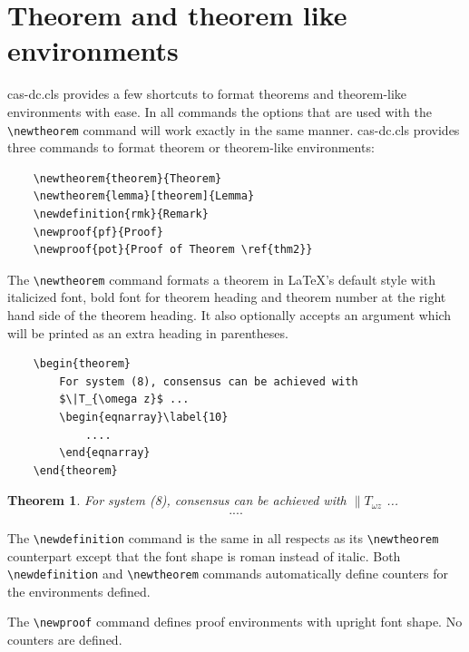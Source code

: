 \documentclass[a4paper,fleqn]{cas-dc}
\begin{document}
\section[Theorem and ...]{Theorem and theorem like environments}

{cas-dc.cls} provides a few shortcuts to format theorems and
theorem-like environments with ease. In all commands the options that
are used with the \verb+\newtheorem+ command will work exactly in the same
manner. {cas-dc.cls} provides three commands to format theorem or
theorem-like environments: 

\begin{verbatim}
	\newtheorem{theorem}{Theorem}
	\newtheorem{lemma}[theorem]{Lemma}
	\newdefinition{rmk}{Remark}
	\newproof{pf}{Proof}
	\newproof{pot}{Proof of Theorem \ref{thm2}}
\end{verbatim}


The \verb+\newtheorem+ command formats a
theorem in \LaTeX's default style with italicized font, bold font
for theorem heading and theorem number at the right hand side of the
theorem heading.  It also optionally accepts an argument which
will be printed as an extra heading in parentheses. 

\begin{verbatim}
	\begin{theorem} 
		For system (8), consensus can be achieved with 
		$\|T_{\omega z}$ ...
		\begin{eqnarray}\label{10}
			....
		\end{eqnarray}
	\end{theorem}
\end{verbatim}  


\newtheorem{theorem}{Theorem}

\begin{theorem}
	For system (8), consensus can be achieved with 
	$\|T_{\omega z}$ ...
	\begin{eqnarray}\label{10}
		....
	\end{eqnarray}
\end{theorem}

The \verb+\newdefinition+ command is the same in
all respects as its \verb+\newtheorem+ counterpart except that
the font shape is roman instead of italic.  Both
\verb+\newdefinition+ and \verb+\newtheorem+ commands
automatically define counters for the environments defined.

The \verb+\newproof+ command defines proof environments with
upright font shape.  No counters are defined. 
\end{document}
